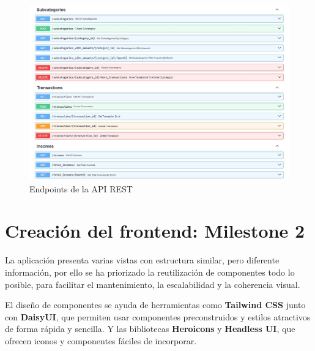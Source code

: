 \begin{figure}[ht!]
    \centering
    \includegraphics[width=\linewidth]{imagenes/endpoints.jpg}
    \caption{Endpoints de la API REST}
    \label{fig:endpoints}
\end{figure}


\section{Creación del frontend: Milestone 2}\label{chap:milestone2}
La aplicación presenta varias vistas con estructura similar, pero diferente información, por ello se ha priorizado la reutilización de componentes todo lo posible, para facilitar el mantenimiento, la escalabilidad y la coherencia visual.


El diseño de componentes se ayuda de herramientas como \textbf{Tailwind CSS} junto con \textbf{DaisyUI}, que permiten usar componentes preconstruidos y estilos atractivos de forma rápida y sencilla. Y las bibliotecas \textbf{Heroicons} y \textbf{Headless UI}, que ofrecen iconos y componentes fáciles de incorporar.


